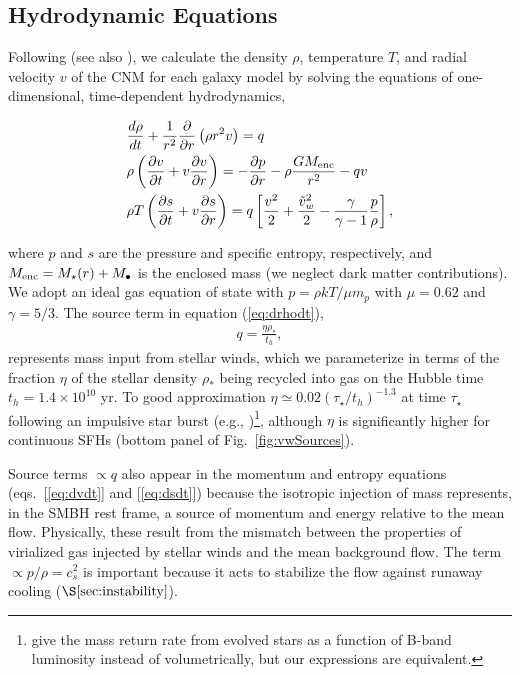 \documentclass[usenatbib,fleqn]{mn2e}
\newcommand{\dxdy}[2]{\frac{d #1}{d #2} }
\newcommand{\drhodt}{\dxdy{\rho}{t}}
\newcommand{\ke}{\frac{v^2}{2}}
\newcommand{\kew}{\frac{\tilde{v}_{w}^2}{2}}
\newcommand{\gammaf}{\frac{\gamma}{\gamma-1}}
\newcommand{\cs}{\frac{p}{\rho}}
\newcommand{\rhostar}{\rho_*}
\newcommand{\Mbh}[1][]{M_{\bullet#1}}
\renewcommand{\th}{t_h}
\begin{document}
\subsection{Hydrodynamic Equations}
\label{sec:hydro}

Following \citet{Quataert:2004a} (see also
\citealt{HolzerAxford:1970a,De-ColleGuillochon+:2012a,ShcherbakovWong+:2014a}),
we calculate the density $\rho$, temperature $T$, and radial velocity
$v$ of the CNM for each galaxy model by solving the equations of
one-dimensional, time-dependent hydrodynamics,

\begin{align}
  &\drhodt+\frac{1}{r^2}\frac{\partial}{\partial r}\left(\rho r^2 v\right)=q \label{eq:drhodt}\\
  &\rho \left(\frac{\partial v}{\partial t} + v\frac{\partial
      v}{\partial r}\right) =-\frac{\partial p}{\partial r}- \rho\frac{GM_{\rm enc}}{r^{2}} -q v \label{eq:dvdt}\\
  &\rho T\left(\frac{\partial s}{\partial t} + v\frac{\partial
      s}{\partial r}\right)=q\left[\ke+\kew-\gammaf \cs \right] ,
\label{eq:dsdt}
\end{align}

where $p$ and $s$ are the pressure and specific entropy, respectively,
and $M_{\rm enc} = M_{\star}(r) + \Mbh$ is the enclosed mass (we
neglect dark matter contributions).  We adopt an ideal gas equation of
state with $p = \rho kT/\mu m_p$ with $\mu = 0.62$ and $\gamma = 5/3$.  The source term in equation (\ref{eq:drhodt}),
\begin{align}
  q=\frac{\eta \rhostar}{\th},
\label{eq:q}
\end{align}
represents mass input from stellar winds, which we parameterize in
terms of the fraction $\eta$ of the stellar density $\rhostar$ being
recycled into gas on the Hubble time $\th = 1.4 \times 10^{10}$ yr.
To good approximation $\eta\simeq 0.02 (\tau_{\star}/t_h)^{-1.3}$ at
time $\tau_{\star}$ following an impulsive star burst (e.g.,
\citealt{Ciotti+91})\footnote{\citet{Ciotti+91} give the mass return
  rate from evolved stars as a function of B-band luminosity instead
  of volumetrically, but our expressions are equivalent.}, although
$\eta$ is significantly higher for continuous SFHs
(bottom panel of Fig.~\ref{fig:vwSources}).

Source terms $\propto q$ also appear in the momentum and entropy
equations (eqs.~[\ref{eq:dvdt}] and [\ref{eq:dsdt}]) because the
isotropic injection of mass represents, in the SMBH rest frame, a
source of momentum and energy relative to the mean flow.  Physically,
these result from the mismatch between the properties of virialized
gas injected by stellar winds and the mean background flow.  The term
$\propto p/\rho = c_{s}^{2}$ is important because it acts to stabilize
the flow against runaway cooling ($\S\ref{sec:instability}$).
\end{document}
